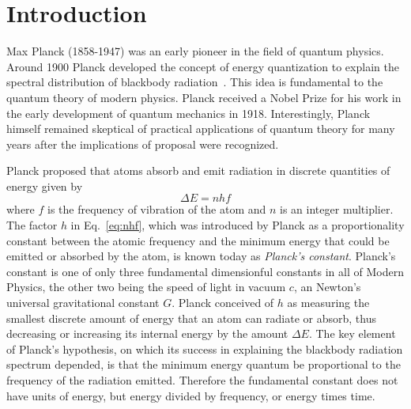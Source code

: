 \documentclass{revtex4}
\begin{document}
\section{Introduction}

Max Planck (1858-1947) was an early pioneer in the field of quantum physics.
Around 1900 Planck developed the concept of energy quantization to explain the
spectral distribution of blackbody radiation~\cite{Planck01}. This idea is
fundamental to the quantum theory of modern physics.  Planck received a Nobel
Prize for his work in the early development of quantum mechanics in 1918.
Interestingly, Planck himself remained skeptical of practical applications
of quantum theory for many years after the implications of proposal were
recognized.

Planck proposed that atoms absorb and emit radiation in discrete
quantities of energy given by
\begin{equation}
\Delta E = nhf
\label{eq:nhf}
\end{equation}
where $f$ is the frequency of vibration of the atom and $n$ is an integer
multiplier.  The factor $h$ in Eq.~\ref{eq:nhf}, which was introduced by
Planck as a proportionality constant between the atomic frequency and the
minimum energy that could be emitted or absorbed by the atom, is known
today as {\em Planck's constant}.  Planck's constant is one of only three
fundamental dimensionful constants in all of Modern Physics, the other two
being the speed of light in vacuum $c$, an Newton's universal gravitational
constant $G$.  Planck conceived of $h$ as measuring the smallest discrete
amount of energy that an atom can radiate or absorb, thus decreasing or
increasing its internal energy by the amount $\Delta E$.  The key element
of Planck's hypothesis, on which its success in explaining the blackbody
radiation spectrum depended, is that the minimum energy quantum be
proportional to the frequency of the radiation emitted.  Therefore the
fundamental constant does not have units of energy, but energy divided
by frequency, or energy times time.
\end{document}

